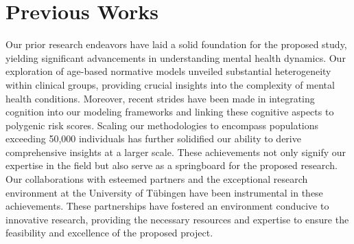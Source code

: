 \section{Previous Works}\label{sec:previous_works}
Our prior research endeavors have laid a solid foundation for the proposed study, yielding significant advancements in understanding mental health dynamics\cite{dinga2019evaluating,wolfers2021replicating,rutherford2022normative}. Our exploration of age-based normative models unveiled substantial heterogeneity within clinical groups, providing crucial insights into the complexity of mental health conditions. Moreover, recent strides have been made in integrating cognition into our modeling frameworks and linking these cognitive aspects to polygenic risk scores\cite{kjelkenes2023mapping}. Scaling our methodologies to encompass populations exceeding 50,000 individuals has further solidified our ability to derive comprehensive insights at a larger scale\cite{rutherford2022charting}.
These achievements not only signify our expertise in the field but also serve as a springboard for the proposed research. Our collaborations with esteemed partners and the exceptional research environment at the University of Tübingen have been instrumental in these achievements. These partnerships have fostered an environment conducive to innovative research, providing the necessary resources and expertise to ensure the feasibility and excellence of the proposed project.